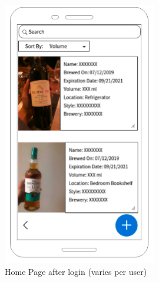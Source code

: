 \begin{figure}[h!]
	\centering
   	\includegraphics[width=0.60\textwidth]{images/home_screen.png}
    \caption{ Home Page after login (varies per user) }
\end{figure}